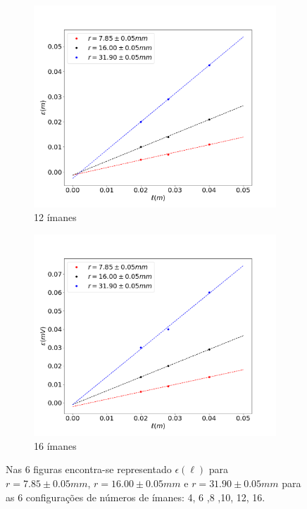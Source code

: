 \documentclass[11pt]{report}
\begin{document}
\begin{figure}[H]
\begin{subfigure}{.5\textwidth}
  \centering
  \includegraphics[width=1\linewidth]{i12lfem.png}
  \caption{12 ímanes}
  \label{fig:sub2}
\end{subfigure}%
\begin{subfigure}{.5\textwidth}
  \centering
  \includegraphics[width=1\linewidth]{i16lfem.png}
  \caption{16 ímanes}
  \label{fig:sub2}
\end{subfigure}
\label{fig:test}
\caption{Nas 6 figuras encontra-se representado $\epsilon(\ell)$ para $r=7.85\pm0.05mm$, $r=16.00\pm0.05mm$ e $r=31.90\pm0.05mm$ para as 6 configurações de números de ímanes: 4, 6 ,8 ,10, 12, 16.}
\end{figure}
\end{document}
